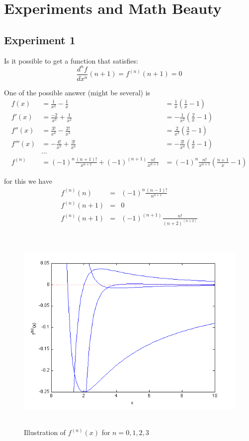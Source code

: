 \chapter{Experiments and Math Beauty}

\section{Experiment 1}
Is it possible to get a function that satisfies:
\begin{equation}
	\frac{d^n f}{dx^n}(n+1) = f^{(n)}(n+1) = 0 
\end{equation}

One of the possible answer (might be several) is 
\begin{eqnarray}
	f(x) &= \frac{1}{x^2} - \frac{1}{x} &= \frac{1}{x}\left(\frac{1}{x}-1\right)\\
	f'(x) &= \frac{-2}{x^3} + \frac{1}{x^2} &=-\frac{1}{x^2}\left(\frac{2}{x}-1\right)\\
	f''(x) &= \frac{3!}{x^4} - \frac{2!}{x^3} &=\frac{2}{x^3}\left(\frac{3}{x}-1\right)\\
	f'''(x) &= -\frac{4!}{x^5} + \frac{3!}{x^4} &=-\frac{3!}{x^4}\left(\frac{4}{x}-1\right)\\
	& \dots &\\
	f^{(n)} &= (-1)^n\frac{(n+1)!}{x^{n+2}}+(-1)^{(n+1)}\frac{n!}{x^{n+1}} &= (-1)^n\frac{n!}{x^{n+1}}\left(\frac{n+1}{x}-1\right)
\end{eqnarray}

for this we have
\begin{eqnarray}
	f^{(n)}(n) &=& (-1)^n\frac{(n-1)!}{n^{n+1}}\\
	f^{(n)}(n+1) &=& 0\\
	f^{(n)}(n+1) &=& (-1)^{(n+1)}\frac{n!}{(n+2)^{(n+2)}}
\end{eqnarray}

\begin{figure}[htbp]
	\centering
		\includegraphics[height=4in]{images/crazyfunc.png}
	\caption{Illustration of $f^{(n)}(x)$ for $n=0, 1,2, 3$}
	\label{fig:images_crazyfunc}
\end{figure}
